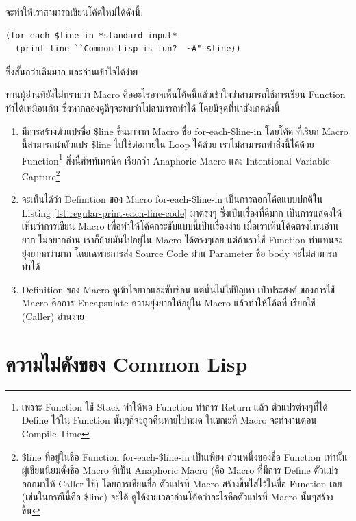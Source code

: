 \documentclass[a4paper]{article}
\begin{document}
จะทำให้เราสามารถเขียนโค้ดใหม่ได้ดังนี้:

\begin{lstlisting}[caption=โค้ดที่อ่านง่าย สบายตา ด้วยการใช้ Macro]
(for-each-$line-in *standard-input*
  (print-line ``Common Lisp is fun?  ~A" $line))
\end{lstlisting}

ซึ่งสั้นกว่าเดิมมาก และอ่านเข้าใจได้ง่าย

ท่านผู้อ่านที่ยังไม่ทราบว่า Macro คืออะไรอาจเห็นโค้ดนี้แล้วเข้าใจว่าสามารถใช้การเขียน
Function ทำได้เหมือนกัน ซึ่งหากลองดูดีๆจะพบว่าไม่สามารถทำได้ โดยมีจุดที่น่าสังเกตดังนี้

\begin{enumerate}
  \item มีการสร้างตัวแปรชื่อ \$line ขึ้นมาจาก Macro ชื่อ for-each-\$line-in โดยโค้ด%
    ที่เรียก Macro นี้สามารถนำตัวแปร \$line ไปใช้ต่อภายใน Loop ได้ด้วย
    เราไม่สามารถทำสิ่งนี้ได้ด้วย Function\footnote{เพราะ Function ใช้ Stack
    ทำให้พอ Function ทำการ Return แล้ว ตัวแปรต่างๆที่ได้ Define ไว้ใน Function
    นั้นๆก็จะถูกคืนหายไปหมด ในขณะที่ Macro จะทำงานตอน Compile Time} สิ่งนี้ศัพท์เทคนิค
    เรียกว่า Anaphoric Macro และ Intentional Variable
    Capture\footnote{\$line ที่อยู่ในชื่อ Function for-each-\$line-in เป็นเพียง%
    ส่วนหนึ่งของชื่อ Function เท่านั้น ผู้เขียนนิยมตั้งชื่อ Macro ที่เป็น Anaphoric
    Macro (คือ Macro ที่มีการ Define ตัวแปรออกมาให้ Caller ใช้) โดยการเขียนชื่อ%
    ตัวแปรที่ Macro สร้างขึ้นใส่ไว้ในชื่อ Function เลย (เช่นในกรณีนี้คือ \$line) จะได้%
    ดูได้ง่ายเวลาอ่านโค้ดว่าอะไรคือตัวแปรที่ Macro นั้นๆสร้างขึ้น}
  \item จะเห็นได้ว่า Definition ของ Macro for-each-\$line-in
    เป็นการลอกโค้ดแบบปกติใน Listing \ref{lst:regular-print-each-line-code} มาตรงๆ
    ซึ่งเป็นเรื่องที่ดีมาก เป็นการแสดงให้เห็นว่าการเขียน Macro เพื่อทำให้โค้ดกระชับแบบนี้เป็นเรื่องง่าย
    เมื่อเราเห็นโค้ดตรงไหนอ่านยาก ไม่อยากอ่าน เราก็ย้ายมันไปอยู่ใน Macro ได้ตรงๆเลย
    แต่ถ้าเราใช้ Function ทำแทนจะยุ่งยากกว่ามาก โดยเฉพาะการส่ง Source Code
    ผ่าน Parameter ชื่อ body จะไม่สามารถทำได้
  \item Definition ของ Macro ดูเข้าใจยากและซับซ้อน แต่นั่นไม่ใช่ปัญหา เป้าประสงค์%
    ของการใช้ Macro คือการ Encapsulate ความยุ่งยากให้อยู่ใน Macro แล้วทำให้โค้ดที่%
    เรียกใช้ (Caller) อ่านง่าย
\end{enumerate}

\section{ความไม่ดังของ Common Lisp}
\end{document}
